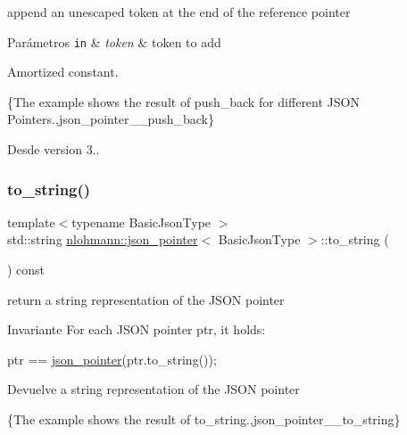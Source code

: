 append an unescaped token at the end of the reference pointer 


\begin{DoxyParams}[1]{Parámetros}
\mbox{\tt in}  & {\em token} & token to add\\
\hline
\end{DoxyParams}
Amortized constant.

\{The example shows the result of {\ttfamily push\+\_\+back} for different J\+S\+ON Pointers.,json\+\_\+pointer\+\_\+\+\_\+push\+\_\+back\}

\begin{DoxySince}{Desde}
version 3.. 
\end{DoxySince}
\mbox{\label{classnlohmann_1_1json__pointer_a3d4b15d32d096e3776c5d2c773b524f5}} 
\subsubsection{\texorpdfstring{to\+\_\+string()}{to\_string()}}
{\footnotesize\ttfamily template$<$typename Basic\+Json\+Type $>$ \\
std\+::string \mbox{\hyperlink{classnlohmann_1_1json__pointer}{nlohmann\+::json\+\_\+pointer}}$<$ Basic\+Json\+Type $>$\+::to\+\_\+string (\begin{DoxyParamCaption}{ }\end{DoxyParamCaption}) const\hspace{0.3cm}{\ttfamily [inline]}}



return a string representation of the J\+S\+ON pointer 

\begin{DoxyInvariant}{Invariante}
For each J\+S\+ON pointer {\ttfamily ptr}, it holds\+: 
\begin{DoxyCode}
ptr == \mbox{\hyperlink{classnlohmann_1_1json__pointer_a7f32d7c62841f0c4a6784cf741a6e4f8}{json\_pointer}}(ptr.to\_string());
\end{DoxyCode}

\end{DoxyInvariant}
\begin{DoxyReturn}{Devuelve}
a string representation of the J\+S\+ON pointer
\end{DoxyReturn}
\{The example shows the result of {\ttfamily to\+\_\+string}.,json\+\_\+pointer\+\_\+\+\_\+to\+\_\+string\}

